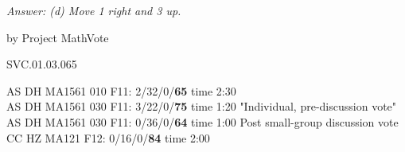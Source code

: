 {\it Answer:  (d) Move 1 right and 3 up.}

\medskip
by Project MathVote

SVC.01.03.065

AS DH MA1561 010 F11: 2/32/0/{\bf65} time 2:30  \\
AS DH MA1561 030 F11: 3/22/0/{\bf75} time 1:20 "Individual, pre-discussion vote" \\
AS DH MA1561 030 F11: 0/36/0/{\bf64} time 1:00 Post small-group discussion vote \\
CC HZ MA121 F12: 0/16/0/{\bf84} time 2:00  \\
